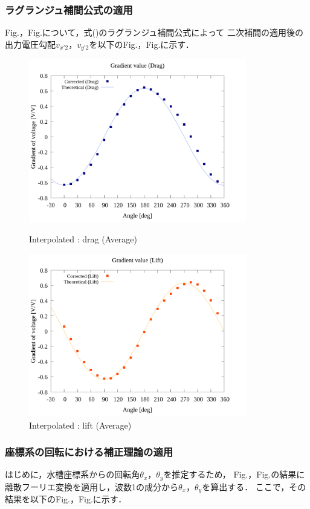 \subsubsection{ラグランジュ補間公式の適用}
Fig.，Fig.について，式()のラグランジュ補間公式によって
二次補間の適用後の出力電圧勾配$v_{x'2}$，$v_{y'2}$を以下のFig.，Fig.に示す．

\begin{figure}[htbp]
		\centering
		\includegraphics[width=95mm]{../../02_workspace/result/2-ex/plot/21/21-3_interpolated_drag.png}
		\caption{Interpolated : drag (Average)}
		\includegraphics[width=95mm]{../../02_workspace/result/2-ex/plot/21/21-3_interpolated_lift.png}
		\caption{Interpolated : lift (Average)}
\end{figure}

\newpage

\subsubsection{座標系の回転における補正理論の適用}
はじめに，水槽座標系からの回転角$\theta_x$，$\theta_y$を推定するため，
Fig.，Fig.の結果に離散フーリエ変換を適用し，波数1の成分から$\theta_x$，$\theta_y$を算出する．
ここで，その結果を以下のFig.，Fig.に示す．

